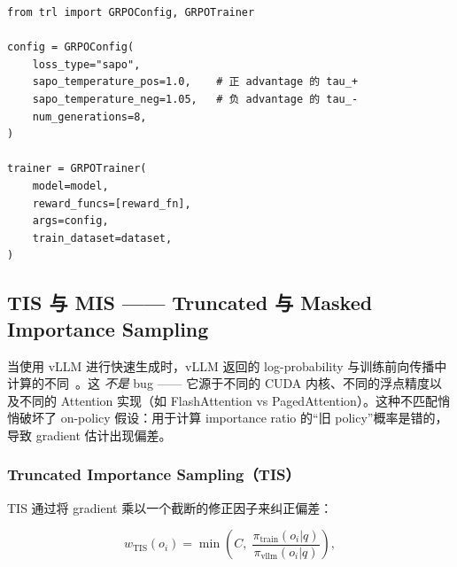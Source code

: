\begin{examplebox}
\begin{lstlisting}[style=pythonstyle]
from trl import GRPOConfig, GRPOTrainer

config = GRPOConfig(
    loss_type="sapo",
    sapo_temperature_pos=1.0,    # 正 advantage 的 tau_+
    sapo_temperature_neg=1.05,   # 负 advantage 的 tau_-
    num_generations=8,
)

trainer = GRPOTrainer(
    model=model,
    reward_funcs=[reward_fn],
    args=config,
    train_dataset=dataset,
)
\end{lstlisting}
\end{examplebox}

\subsection{TIS 与 MIS —— Truncated 与 Masked Importance Sampling}
\label{sec:tis-mis}

\begin{warningbox}[隐蔽的 vLLM 概率不匹配]
当使用 vLLM 进行快速生成时，vLLM 返回的 log-probability 与训练前向传播中计算的不同~\cite{zhong2025tismis}。这 \emph{不是} bug —— 它源于不同的 CUDA 内核、不同的浮点精度以及不同的 Attention 实现（如 FlashAttention vs PagedAttention）。这种不匹配悄悄破坏了 on-policy 假设：用于计算 importance ratio 的“旧 policy”概率是错的，导致 gradient 估计出现偏差。
\end{warningbox}

\subsubsection*{Truncated Importance Sampling（TIS）}
\label{truncated-importance-sampling-tis}

TIS 通过将 gradient 乘以一个截断的修正因子来纠正偏差：

\[
\boxed{
    w_{\text{TIS}}(o_i) = \min\!\left(C,\; \frac{\pi_{\text{train}}(o_i|q)}{\pi_{\text{vllm}}(o_i|q)}\right),
  }
\]

